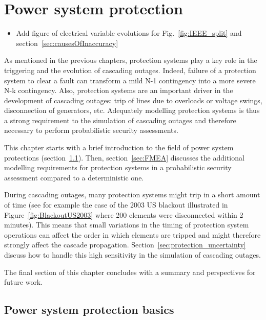 \chapter{Power system protection}
\label{ch:protections}
\minitoc

\begin{itemize}
    \item Add figure of electrical variable evolutions for Fig.~\ref{fig:IEEE_split} and section~\ref{sec:causesOfInaccuracy}
\end{itemize}

As mentioned in the previous chapters, protection systems play a key role in the triggering and the evolution of cascading outages. Indeed, failure of a protection system to clear a fault can transform a mild N-1 contingency into a more severe N-k contingency. Also, protection systems are an important driver in the development of cascading outages: trip of lines due to overloads or voltage swings, disconnection of generators, etc. Adequately modelling protection systems is thus a strong requirement to the simulation of cascading outages and therefore necessary to perform probabilistic security assessments.

This chapter starts with a brief introduction to the field of power system protections (section~\ref{sec:protection_basics}). Then, section~\ref{sec:FMEA} discusses the additional modelling requirements for protection systems in a probabilistic security assessment compared to a deterministic one.

During cascading outages, many protection systems might trip in a short amount of time (see for example the case of the 2003 US blackout illustrated in Figure~\ref{fig:BlackoutUS2003} where 200 elements were disconnected within 2 minutes). This means that small variations in the timing of protection system operations can affect the order in which elements are tripped and might therefore strongly affect the cascade propagation. Section~\ref{sec:protection_uncertainty} discuss how to handle this high sensitivity in the simulation of cascading outages.

The final section of this chapter concludes with a summary and perspectives for future work.


\section{Power system protection basics}
\label{sec:protection_basics}

